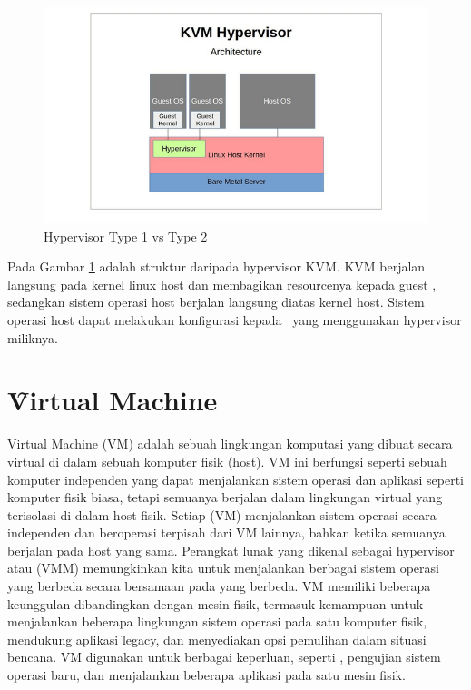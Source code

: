 \begin{figure}
	\centering
	\includegraphics[width=1\textwidth]
		{assets/pics/xen-kvm.png}
	\caption{Hypervisor Type 1 vs Type 2}
	\label{fig:xen-kvm}
\end{figure}

Pada Gambar \ref{fig:xen-kvm} adalah struktur daripada hypervisor KVM. KVM berjalan langsung pada kernel linux host dan membagikan resourcenya kepada guest \vm, sedangkan sistem operasi host berjalan langsung diatas kernel host. Sistem operasi host dapat melakukan konfigurasi kepada \vm\ yang menggunakan hypervisor miliknya.

\section{\f{Virtual Machine}}

Virtual Machine (VM) adalah sebuah lingkungan komputasi yang dibuat secara virtual di dalam sebuah komputer fisik (host)\cite{Pradilla2016}. VM ini berfungsi seperti sebuah komputer independen yang dapat menjalankan sistem operasi dan aplikasi seperti komputer fisik biasa, tetapi semuanya berjalan dalam lingkungan virtual yang terisolasi di dalam host fisik. Setiap \vm (VM) menjalankan sistem operasi secara independen dan beroperasi terpisah dari VM lainnya, bahkan ketika semuanya berjalan pada host yang sama. Perangkat lunak yang dikenal sebagai hypervisor atau \vmm (VMM) memungkinkan kita untuk menjalankan berbagai sistem operasi yang berbeda secara bersamaan pada \vm yang berbeda. VM memiliki beberapa keunggulan dibandingkan dengan mesin fisik, termasuk kemampuan untuk menjalankan beberapa lingkungan sistem operasi pada satu komputer fisik, mendukung aplikasi \f{legacy}, dan menyediakan opsi pemulihan dalam situasi bencana. VM digunakan untuk berbagai keperluan, seperti \cc, pengujian sistem operasi baru, dan menjalankan beberapa aplikasi pada satu mesin fisik\cite{ibmWhatVirtualMachine}.

